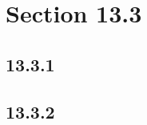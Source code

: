 





\section*{Section 13.3}

\subsection*{13.3.1}
\begin{enumerate}
\end{enumerate}

\subsection*{13.3.2}
\begin{enumerate}
\end{enumerate}

